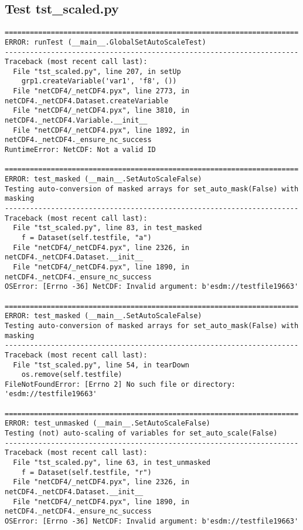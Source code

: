 \subsection{Test tst\_scaled.py}

\begin{verbatim}
======================================================================
ERROR: runTest (__main__.GlobalSetAutoScaleTest)
----------------------------------------------------------------------
Traceback (most recent call last):
  File "tst_scaled.py", line 207, in setUp
    grp1.createVariable('var1', 'f8', ())
  File "netCDF4/_netCDF4.pyx", line 2773, in netCDF4._netCDF4.Dataset.createVariable
  File "netCDF4/_netCDF4.pyx", line 3810, in netCDF4._netCDF4.Variable.__init__
  File "netCDF4/_netCDF4.pyx", line 1892, in netCDF4._netCDF4._ensure_nc_success
RuntimeError: NetCDF: Not a valid ID

======================================================================
ERROR: test_masked (__main__.SetAutoScaleFalse)
Testing auto-conversion of masked arrays for set_auto_mask(False) with masking
----------------------------------------------------------------------
Traceback (most recent call last):
  File "tst_scaled.py", line 83, in test_masked
    f = Dataset(self.testfile, "a")
  File "netCDF4/_netCDF4.pyx", line 2326, in netCDF4._netCDF4.Dataset.__init__
  File "netCDF4/_netCDF4.pyx", line 1890, in netCDF4._netCDF4._ensure_nc_success
OSError: [Errno -36] NetCDF: Invalid argument: b'esdm://testfile19663'

======================================================================
ERROR: test_masked (__main__.SetAutoScaleFalse)
Testing auto-conversion of masked arrays for set_auto_mask(False) with masking
----------------------------------------------------------------------
Traceback (most recent call last):
  File "tst_scaled.py", line 54, in tearDown
    os.remove(self.testfile)
FileNotFoundError: [Errno 2] No such file or directory: 'esdm://testfile19663'

======================================================================
ERROR: test_unmasked (__main__.SetAutoScaleFalse)
Testing (not) auto-scaling of variables for set_auto_scale(False)
----------------------------------------------------------------------
Traceback (most recent call last):
  File "tst_scaled.py", line 63, in test_unmasked
    f = Dataset(self.testfile, "r")
  File "netCDF4/_netCDF4.pyx", line 2326, in netCDF4._netCDF4.Dataset.__init__
  File "netCDF4/_netCDF4.pyx", line 1890, in netCDF4._netCDF4._ensure_nc_success
OSError: [Errno -36] NetCDF: Invalid argument: b'esdm://testfile19663'


\end{verbatim}

